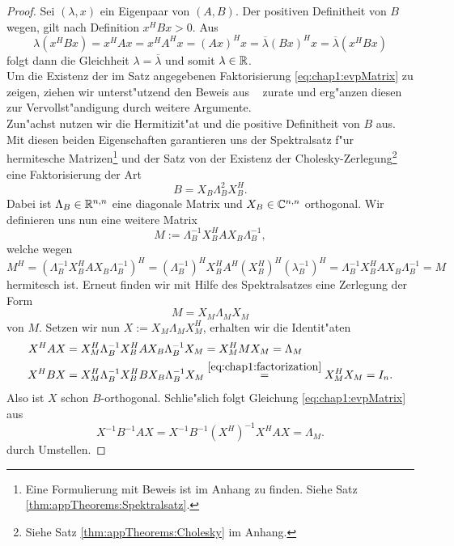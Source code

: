 \begin{proof}
Sei $(\lambda,x)$ ein Eigenpaar von $(A,B)$. Der positiven Definitheit von $B$ wegen, gilt nach Definition $x^H B x > 0$. Aus
\[
\lambda (x^H B x) = x^H Ax = x^H A^H x = (Ax)^H x
= \overline{\lambda} (Bx)^H x = \overline{\lambda} (x^H B x)
\]
folgt dann die Gleichheit $\lambda = \overline{\lambda}$ und somit $\lambda\in\mathbb{R}$.\\

 Um die Existenz der im Satz angegebenen Faktorisierung \eqref{eq:chap1:evpMatrix}
zu zeigen, ziehen wir unterst"utzend den Beweis aus ~\cite[Theorem 15.3.2, 344 f.]{parlett} zurate und erg"anzen diesen zur Vervollst"andigung durch weitere Argumente.\\


Zun"achst nutzen wir die Hermitizit"at und die positive Definitheit von $B$ aus. Mit diesen beiden Eigenschaften garantieren uns der Spektralsatz f"ur hermitesche Matrizen\footnote{Eine Formulierung mit Beweis ist im Anhang zu finden. Siehe Satz \ref{thm:appTheorems:Spektralsatz}.}
und der Satz von der Existenz der Cholesky-Zerlegung\footnote{Siehe Satz \ref{thm:appTheorems:Cholesky} im Anhang.} eine Faktorisierung der Art
\begin{equation}\label{eq:chap1:factorization}
B = X_B \Lambda_B^2 X_B^H.
\end{equation}
Dabei ist $\Lambda_B\in\mathbb{R}^{n,n}$ eine diagonale Matrix und $X_B \in \mathbb{C}^{n,n}$ orthogonal.
Wir definieren uns nun eine weitere Matrix
\[
M:= \Lambda_B^{-1} X_B^H A X_B \Lambda_B^{-1},
\]
welche wegen
\[
M^H = \left(\Lambda_B^{-1} X_B^H A X_B \Lambda_B^{-1}\right)^H
= (\Lambda_B^{-1})^{H} X_B^H A^H (X_B^H)^H (\lambda_B^{-1})^H
= \Lambda_B^{-1} X_B^H A X_B \Lambda_B^{-1}
= M
\]
hermitesch ist. Erneut finden wir mit Hilfe des Spektralsatzes eine Zerlegung der Form
\[
M = X_M \Lambda_M X_M
\]
von $M$. Setzen wir nun $X:=X_M \Lambda_M X_M^H$, erhalten wir die Identit"aten
\begin{align*}
X^H A X &= X_M^H \Lambda_B^{-1} X_B^H A X_B \Lambda_B^{-1} X_M = X_M^H M X_M = \Lambda_M\\
X^H B X &= X_M^H \Lambda_B^{-1} X_B^H B X_B \Lambda_B^{-1} X_M \overset{\eqref{eq:chap1:factorization}}{=} X_M^H X_M = I_n.
\end{align*}
Also ist $X$ schon $B$-orthogonal. Schlie"slich folgt Gleichung \eqref{eq:chap1:evpMatrix} aus
\[
X^{-1}B^{-1}AX = X^{-1}B^{-1} (X^H)^{-1} X^H AX = \Lambda_M.
\]
durch Umstellen.
\end{proof}

